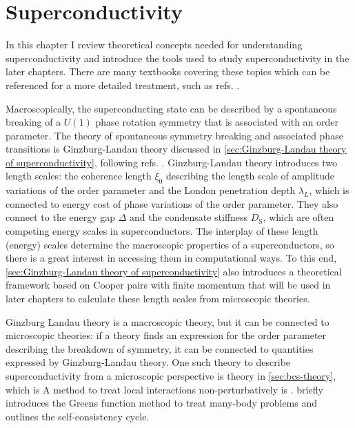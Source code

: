 \documentclass[../notes.tex]{subfiles}
\begin{document}
\raggedbottom

\chapter{Superconductivity}\label{ch:superconductivity}

In this chapter I review theoretical concepts needed for understanding superconductivity and introduce the tools used to study superconductivity in the later chapters.
There are many textbooks covering these topics which can be referenced for a more detailed treatment, such as refs. \cite{colemanIntroductionManyBodyPhysics2015, tinkhamIntroductionSuperconductivity1996, bruusManyBodyQuantumTheory2004, larkinTheoryFluctuationsSuperconductors2005, bennemannSuperconductivity2008}.

Macroscopically, the superconducting state can be described by a spontaneous breaking of a \(U(1)\) phase rotation symmetry that is associated with an order parameter.
The theory of spontaneous symmetry breaking and associated phase transitions is Ginzburg-Landau theory discussed in \cref{sec:Ginzburg-Landau theory of superconductivity}, following refs. \cite{beekmanIntroductionSpontaneousSymmetry2019, colemanIntroductionManyBodyPhysics2015}.
Ginzburg-Landau theory introduces two length scales: the coherence length \(\xi_0\) describing the length scale of amplitude variations of the order parameter and the London penetration depth \(\lambda_L\), which is connected to energy cost of phase variations of the order parameter.
They also connect to the energy gap \(\Delta\) and the condensate stiffness \(D_{\mathrm{S}}\), which are often competing energy scales in superconductors.
The interplay of these length (energy) scales determine the macroscopic properties of a superconductors, so there is a great interest in accessing them in computational ways.
To this end, \cref{sec:Ginzburg-Landau theory of superconductivity} also introduces a theoretical framework based on Cooper pairs with finite momentum \cite{wittBypassingLatticeBCS2024} that will be used in later chapters to calculate these length scales from microscopic theories.

Ginzburg Landau theory is a macroscopic theory, but it can be connected to microscopic theories: if a theory finds an expression for the order parameter describing the breakdown of symmetry, it can be connected to quantities expressed by Ginzburg-Landau theory.
One such theory to describe superconductivity from a microscopic perspective is  theory in \cref{sec:bcs-theory}, which is 
A method to treat local interactions non-perturbatively is .  briefly introduces the Greens function method to treat many-body problems and outlines the  self-consistency cycle.
\end{document}
